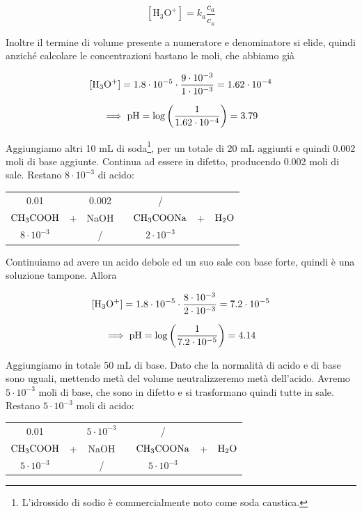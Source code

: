 $$[\text{H}_3\text{O}^+] = k_a \frac{c_a}{c_s}$$

Inoltre il termine di volume presente a numeratore e denominatore si elide, quindi anziché calcolare le concentrazioni bastano le moli, che abbiamo già

$$\rm [H_3O^+]=1.8 \cdot 10^{-5} \cdot \frac{9 \cdot 10^{-3}}{1 \cdot 10^{-3}}=1.62 \cdot 10^{-4}$$

$$\implies \rm pH=\log\left(\frac{1}{1.62 \cdot 10^{-4}}\right)=3.79$$

Aggiungiamo altri 10 mL di soda\footnote{L'idrossido di sodio è commercialmente noto come soda caustica.}, per un totale di 20 mL aggiunti e quindi 0.002 moli di base aggiunte. Continua ad essere in difetto, producendo 0.002 moli di sale. Restano $8 \cdot 10^{-3}$ di acido:

\begin{center}
    \begin{tabular}{ccccccc}
        0.01 &  & 0.002  & & / & &\\
        $\rm CH_3COOH$ & + & NaOH & \ce{->} & $\rm CH_3COONa$ & + & $\rm H_2O$\\
        $8 \cdot 10^{-3}$ &  &  / & & $2 \cdot 10^{-3}$ & &\\
    \end{tabular}
\end{center}

Continuiamo ad avere un acido debole ed un suo sale con base forte, quindi è una soluzione tampone. Allora

$$\rm [H_3O^+]=1.8 \cdot 10^{-5}\cdot \frac{8 \cdot 10^{-3}}{2 \cdot 10^{-3}}=7.2 \cdot 10^{-5}$$

$$\implies \rm pH=\log\left(\frac{1}{7.2 \cdot 10^{-5}}\right)=4.14$$

Aggiungiamo in totale 50 mL di base. Dato che la normalità di acido e di base sono uguali, mettendo metà del volume neutralizzeremo metà dell'acido. Avremo $5 \cdot 10^{-3}$ moli di base, che sono in difetto e si trasformano quindi tutte in sale. Restano $5 \cdot 10^{-3}$ moli di acido:

\begin{center}
    \begin{tabular}{ccccccc}
        0.01 &  & $5 \cdot 10^{-3}$  & & / & &\\
        $\rm CH_3COOH$ & + & NaOH & \ce{->} & $\rm CH_3COONa$ & + & $\rm H_2O$\\
        $5 \cdot 10^{-3}$ &  &  / & & $5 \cdot 10^{-3}$ & &\\
    \end{tabular}
\end{center}

